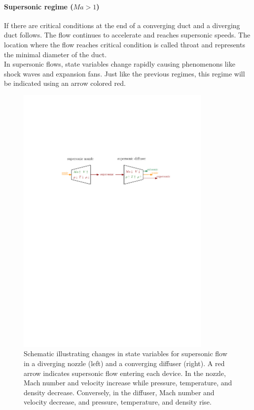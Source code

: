 	\paragraph{Supersonic regime ($Ma > 1$)} 
		If there are critical conditions at the end of a converging duct and a diverging duct follows.
		The flow continues to accelerate and reaches supersonic speeds.
		The location where the flow reaches critical condition is called throat and represents the minimal diameter of the duct.\\
		In supersonic flows, state variables change rapidly causing phenomenons like shock waves and expansion fans.
		Just like the previous regimes, this regime will be indicated using an arrow colored red.
		\cite{Cantwell_AA210A}
		\begin{figure}[H]
		    \centering
		    \includegraphics[width=0.85\textwidth]{src/02_foundations/fig_variable-change-supersonic.pdf}
			\caption{
				Schematic illustrating changes in state variables for supersonic flow in a diverging nozzle (left) and a converging diffuser (right).
				A red arrow indicates supersonic flow entering each device.
				In the nozzle, Mach number and velocity increase while pressure, temperature, and density decrease.
				Conversely, in the diffuser, Mach number and velocity decrease, and pressure, temperature, and density rise.
				\cite{Cengel2017}
			}
		\end{figure}
